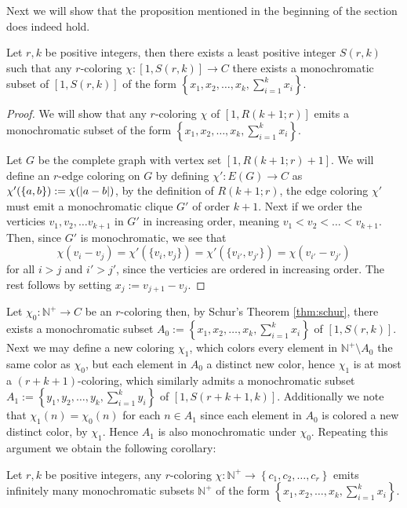 Next we will show that the proposition mentioned in the beginning of the section does indeed hold.
\begin{theorem}\label{thm:schur}
	Let $r, k$ be positive integers, then there exists a least positive integer $S(r, k)$ such that any $r$-coloring $\chi: [1, S(r, k)] \to C$ there exists a monochromatic subset of $[1, S(r, k)]$ of the form $\left\{x_1, x_2, \ldots, x_{k}, \sum_{i = 1}^k x_i\right\}$.
\end{theorem}
\begin{proof}
	We will show that any $r$-coloring $\chi$ of $[1, R(k + 1; r)]$ emits a monochromatic subset of the form $\left\{x_1, x_2, \ldots, x_{k}, \sum_{i = 1}^k x_i\right\}$.

	Let $G$ be the complete graph with vertex set $[1, R(k + 1; r) + 1]$. We will define an $r$-edge coloring on $G$ by defining $\chi': E(G) \to C$ as $\chi'(\left\{a, b\right\}) := \chi(\left\lvert a - b\right\rvert)$, by the definition of $R(k + 1; r)$, the edge coloring $\chi'$ must emit a monochromatic clique $G'$ of order $k + 1$. Next if we order the verticies $v_1, v_2, \ldots v_{k + 1}$ in $G'$ in increasing order, meaning $v_1 < v_2 < \ldots < v_{k + 1}$.
	Then, since $G'$ is monochromatic, we see that
	\begin{equation*}
		\chi(v_i - v_j) = \chi'(\{v_i, v_j\}) = \chi'(\{v_{i'}, v_{j'} \}) = \chi(v_{i'} - v_{j'})
	\end{equation*}
	for all $i > j$ and $i' > j'$, since the verticies are ordered in increasing order. The rest follows by setting $x_j := v_{j + 1} - v_{j}$.
\end{proof}
Let $\chi_{0}: \mathbb{N}^+ \to C$ be an $r$-coloring then, by Schur's Theorem \ref{thm:schur}, there exists a monochromatic subset $A_0 := \left\{x_1, x_2, \ldots, x_{k}, \sum_{i = 1}^k x_i\right\}$ of $[1, S(r, k)]$. Next we may define a new coloring $\chi_1$, which colors every element in $\mathbb{N}^+ \setminus A_{0}$ the same color as $\chi_{0}$, but each element in $A_{0}$ a distinct new color, hence $\chi_1$ is at most a $(r + k + 1)$-coloring, which similarly admits a monochromatic subset $A_1 := \left\{y_1, y_2, \ldots, y_{k}, \sum_{i = 1}^k y_{i}\right\}$ of $[1, S(r + k + 1, k)]$. Additionally we note that $\chi_1(n) = \chi_0(n)$ for each $n \in A_1$ since each element in $A_0$ is colored a new distinct color, by $\chi_{1}$. Hence $A_1$ is also monochromatic under $\chi_0$. Repeating this argument we obtain the following corollary:
\begin{corollary}
	Let $r, k$ be positive integers, any $r$-coloring $\chi: \mathbb{N}^{+} \to \left\{c_1, c_2, \ldots, c_{r}\right\}$ emits infinitely many monochromatic subsets $\mathbb{N}^{+}$ of the form $\left\{x_1, x_2, \ldots, x_{k}, \sum_{i = 1}^k x_i\right\}$.
\end{corollary}


